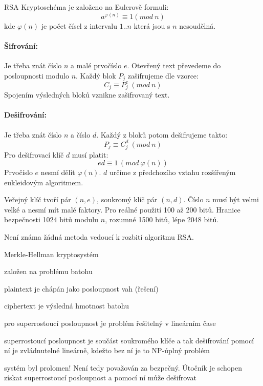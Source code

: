 \begin{obecne}{RSA}
  Kryptoschéma je založeno na Eulerově formuli: 
  $$a^{\varphi(n)} \equiv 1(mod\ n)$$ 
  kde $\varphi(n)$ je počet čísel z intervalu $1..n$ která jsou s $n$ nesoudělná.

  \paragraph{Šifrování:} Je třeba znát číslo $n$ a malé prvočíslo $e$. Otevřený
  text převedeme do posloupnosti modulo $n$. Každý blok $P_j$ zašifrujeme dle
  vzorce: $$C_j\equiv P_j^e\ (mod\ n)$$ Spojením výsledných bloků vznikne
  zašifrovaný text.

  \paragraph{Dešifrování:} Je třeba znát číslo $n$ a číslo $d$. Každý z bloků
  potom dešifrujeme takto: $$P_j\equiv C_j^d\ (mod\ n)$$ Pro dešifrovací klíč
  $d$ musí platit: $$ed\equiv 1\,(mod\ \varphi(n))$$ Prvočíslo $e$ nesmí dělit
  $\varphi(n)$. $d$ určíme z předchozího vztahu rozšířeným eukleidovým
  algoritmem.

  Veřejný klíč tvoří pár $(n, e)$, soukromý klíč pár $(n, d)$. Číslo $n$ musí být velmi
  velké a nesmí mít malé faktory. Pro reálné použití 100 až 200 bitů. Hranice bezpečnosti
  1024 bitů modulu $n$, rozumné 1500 bitů, lépe 2048 bitů.

  Není známa žádná metoda vedoucí k rozbití algoritmu RSA. 
\end{obecne}

\begin{obecne}{Merkle-Hellman kryptosystém}
  \begin{pitemize}
    \item založen na problému batohu
    \item plaintext je chápán jako posloupnost vah (řešení)
    \item ciphertext je výsledná hmotnost batohu
    \item pro superrostoucí posloupnost je problém řešitelný v lineárním čase
    \item superrostoucí posloupnost je součást soukromého klíče a tak
    dešifrování pomocí ní je zvládnutelné lineárně, kdežto bez ní je to NP-úplný
    problém
    \item systém byl prolomen! Není tedy považován za bezpečný. Útočník je
    schopen získat superrostoucí posloupnost a pomocí ní může dešifrovat
  \end{pitemize}
\end{obecne}

